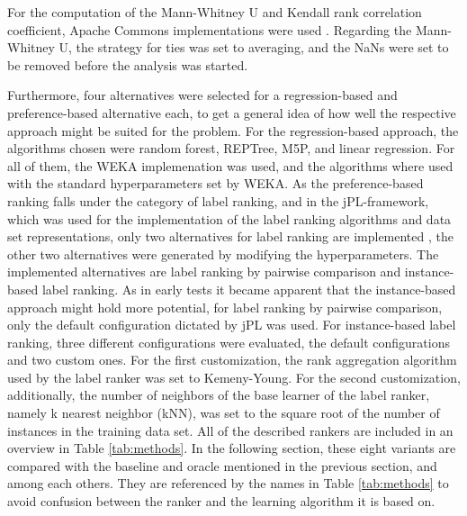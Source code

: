 For the computation of the Mann-Whitney U and Kendall rank correlation coefficient, Apache Commons implementations were used \cite{apache}. Regarding the Mann-Whitney U, the strategy for ties was set to averaging, and the NaNs were set to be removed before the analysis was started.

Furthermore, four alternatives were selected for a regression-based and preference-based alternative each, to get a general idea of how well the respective approach might be suited for the problem. For the regression-based approach, the algorithms chosen were random forest, REPTree, M5P, and linear regression. For all of them, the WEKA implemenation \cite{hall2009weka} was used, and the algorithms where used with the standard hyperparameters set by WEKA. As the preference-based ranking falls under the category of label ranking, and in the jPL-framework, which was used for the implementation of the label ranking algorithms and data set representations, only two alternatives for label ranking are implemented \cite{intelligent2017jpl}, the other two alternatives were generated by modifying the hyperparameters. The implemented alternatives are label ranking by pairwise comparison and instance-based label ranking. As in early tests it became apparent that the instance-based approach might hold more potential, for label ranking by pairwise comparison, only the default configuration dictated by jPL was used. For instance-based label ranking, three different configurations were evaluated, the default configurations and two custom ones. For the first customization, the rank aggregation algorithm used by the label ranker was set to Kemeny-Young. For the second customization, additionally, the number of neighbors of the base learner of the label ranker, namely k nearest neighbor (kNN), was set to the square root of the number of instances in the training data set. All of the described rankers are included in an overview in Table \ref{tab:methods}. In the following section, these eight variants are compared with the baseline and oracle mentioned in the previous section, and among each others. They are referenced by the names in Table \ref{tab:methods} to avoid confusion between the ranker and the learning algorithm it is based on.

